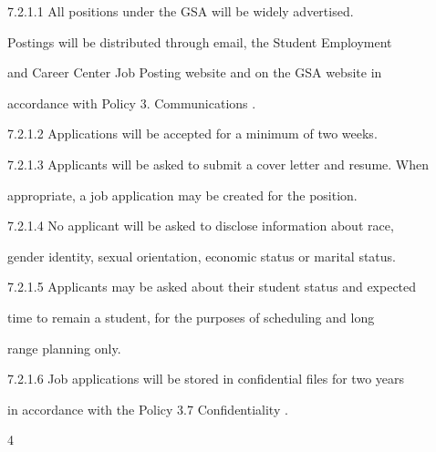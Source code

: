 7.2.1.1  All    positions    under    the    GSA    will    be    widely    advertised.   

         Postings   will   be distributed through  email, the  Student Employment  

         and  Career  Center  Job  Posting  website  and  on  the  GSA  website  in  

         accordance with Policy 3. Communications .  



  



7.2.1.2 Applications will be accepted for a minimum of two weeks.  



  



7.2.1.3 Applicants will be asked to submit a cover letter and resume. When  

         appropriate, a job application may be created for the position.  



  



7.2.1.4 No  applicant  will  be  asked  to  disclose  information  about  race,  

         gender  identity, sexual orientation, economic status or marital status.  



  



7.2.1.5 Applicants may be asked about their student status and expected  

         time to remain a student, for the purposes of scheduling and long  

         range planning only.  



  



7.2.1.6 Job  applications  will  be  stored  in  confidential  files  for  two  years  

         in  accordance with the Policy 3.7 Confidentiality .  



                                                   



                                                   



                                                       4  

